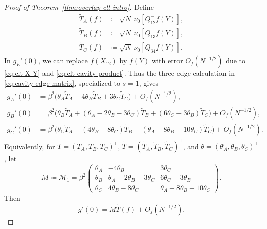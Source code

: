 \documentclass[11pt]{article}
\numberwithin{equation}{section}
\newcommand{\1}{\mathbf 1}
\begin{document}
\begin{proof}[Proof of Theorem~\ref{thm:overlap-clt-intro}]
Define
\begin{align}
 \widetilde T_A(f)
 &\coloneqq\sqrt N\,\nu_0[Q^-_{12}f(Y)],
 \label{eq:clt-Ttilde-A}\\
 \widetilde T_B(f)
 &\coloneqq\sqrt N\,\nu_0[Q^-_{13}f(Y)],
 \label{eq:clt-Ttilde-B}\\
 \widetilde T_C(f)
 &\coloneqq\sqrt N\,\nu_0[Q^-_{34}f(Y)].
 \label{eq:clt-Ttilde-C}
\end{align}
In $g_E'(0)$, we can replace $f(X_{12})$ by $f(Y)$ with error
$O_f(N^{-1/2})$ due to \eqref{eq:clt-X-Y} and
\eqref{eq:clt-cavity-product}.  Thus the three-edge calculation in
\eqref{eq:cavity-edge-matrix}, specialized to $s=1$, gives
\begin{align}
 g_A'(0)&=\beta^2\bigl(
 \theta_A\widetilde T_A-4\theta_B\widetilde T_B
 +3\theta_C\widetilde T_C\bigr)+O_f(N^{-1/2}),
 \label{eq:clt-row-A}\\
 g_B'(0)&=\beta^2\bigl(
 \theta_B\widetilde T_A
 +(\theta_A-2\theta_B-3\theta_C)\widetilde T_B
 +(6\theta_C-3\theta_B)\widetilde T_C\bigr)
 +O_f(N^{-1/2}),
 \label{eq:clt-row-B}\\
 g_C'(0)&=\beta^2\bigl(
 \theta_C\widetilde T_A
 +(4\theta_B-8\theta_C)\widetilde T_B
 +(\theta_A-8\theta_B+10\theta_C)\widetilde T_C\bigr)
 +O_f(N^{-1/2}).
 \label{eq:clt-row-C}
\end{align}
Equivalently, for $T=(T_A,T_B,T_C)^{\mathsf T}$,
$\widetilde T=(\widetilde T_A,\widetilde T_B,\widetilde T_C)^{\mathsf T}$,
and $\theta=(\theta_A,\theta_B,\theta_C)^{\mathsf T}$, let
\begin{equation}
 M\coloneqq\mathcal M_1
 =\beta^2
 \begin{pmatrix}
 \theta_A&-4\theta_B&3\theta_C\\
 \theta_B&\theta_A-2\theta_B-3\theta_C&6\theta_C-3\theta_B\\
 \theta_C&4\theta_B-8\theta_C&\theta_A-8\theta_B+10\theta_C
 \end{pmatrix}.
 \label{eq:clt-cavity-matrix}
\end{equation}
Then
\begin{equation}
 g'(0)=M\widetilde T(f)+O_f(N^{-1/2}).
 \label{eq:clt-g-prime-zero}
\end{equation}


\end{proof}
\end{document}
